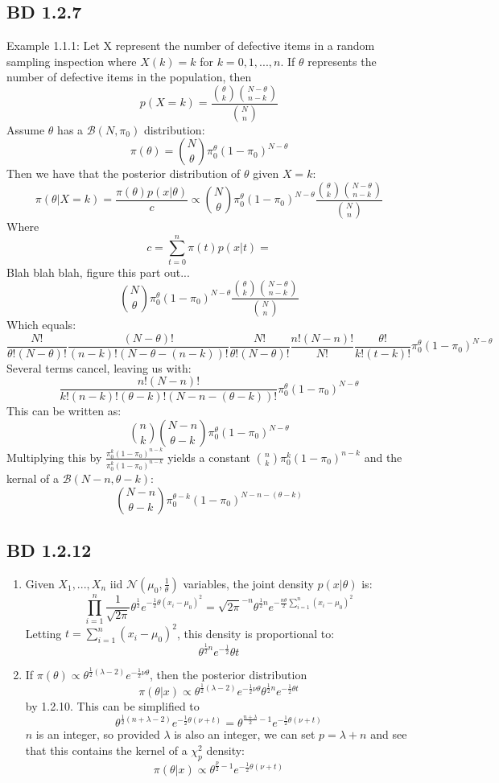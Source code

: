 \documentclass[a4paper,12pt]{article}
\begin{document}
\subsection{BD 1.2.7}
Example 1.1.1: Let X represent the number of defective items in a random sampling inspection where $X(k)=k$ for $k=0,1,...,n$. If $\theta$ represents the number of defective items in the population, then $$p(X=k)=\frac{{\theta\choose k}{N-\theta\choose n-k}}{{N\choose n}}$$ Assume $\theta$ has a $\mathcal{B}(N,\pi_0)$ distribution: $$\pi(\theta)={N\choose\theta}\pi_0^\theta(1-\pi_0)^{N-\theta}$$
Then we have that the posterior distribution of $\theta$ given $X=k$: $$\pi(\theta|X=k)=\frac{\pi(\theta)p(x|\theta)}{c}\propto{N\choose\theta}\pi_0^\theta(1-\pi_0)^{N-\theta}\frac{{\theta\choose k}{N-\theta\choose n-k}}{{N\choose n}}$$
Where $$c=\sum_{t=0}^n\pi(t)p(x|t)=$$
Blah blah blah, figure this part out...
$${N\choose\theta}\pi_0^\theta(1-\pi_0)^{N-\theta}\frac{{\theta\choose k}{N-\theta\choose n-k}}{{N\choose n}}$$
Which equals:$$\frac{N!}{\theta!(N-\theta)!}\frac{(N-\theta)!}{(n-k)!(N-\theta-(n-k))!}\frac{N!}{\theta!(N-\theta)!}\frac{n!(N-n)!}{N!}\frac{\theta!}{k!(t-k)!}\pi_0^{\theta}(1-\pi_0)^{N-\theta}$$
Several terms cancel, leaving us with:
$$\frac{n!(N-n)!}{k!(n-k)!(\theta-k)!(N-n-(\theta-k))!}\pi_0^\theta(1-\pi_0)^{N-\theta}$$
This can be written as:
$${n\choose k}{N-n\choose \theta-k}\pi_0^\theta(1-\pi_0)^{N-\theta}$$
Multiplying this by $\frac{\pi_0^k(1-\pi_0)^{n-k}}{\pi_0^k(1-\pi_0)^{n-k}}$ yields a constant ${n\choose k}\pi_0^k(1-\pi_0)^{n-k}$ and the kernal of a $\mathcal{B}(N-n,\theta-k)$:$${N-n\choose \theta-k}\pi_0^{\theta-k}(1-\pi_0)^{N-n-(\theta-k)}$$
\subsection{BD 1.2.12}
\begin{enumerate}
  \item Given $X_1,...,X_n$ iid $\mathcal{N}(\mu_0,\frac{1}{\theta})$ variables, the joint density $p(x|\theta)$ is:
  $$\prod_{i=1}^n \frac{1}{\sqrt{2\pi}}\theta^{\frac{1}{2}}e^{-\frac{1}{2}\theta(x_i-\mu_0)^2}=\sqrt{2\pi}^{-n} \theta^{\frac{1}{2}n}e^{-\frac{n\theta}{2}\sum_{i=1}^n(x_i-\mu_0)^2}$$
  Letting $t=\sum_{i=1}^n (x_i-\mu_0)^2$, this density is proportional to:$$\theta^{\frac{1}{2}n}e^{-\frac{1}{2}}\theta t$$
  \item If $\pi(\theta)\propto\theta^{\frac{1}{2}(\lambda-2)}e^{-\frac{1}{2}\nu\theta}$, then the posterior distribution $$\pi(\theta|x)\propto\theta^{\frac{1}{2}(\lambda-2)}e^{-\frac{1}{2}\nu\theta} \theta^{\frac{1}{2}n}e^{-\frac{1}{2}\theta t}$$ by 1.2.10. This can be simplified to $$\theta^{\frac{1}{2}(n+\lambda-2)}e^{-\frac{1}{2}\theta(\nu+t)}=\theta^{\frac{n+\lambda}{2}-1}e^{-\frac{1}{2}\theta(\nu+t)}$$
  $n$ is an integer, so provided $\lambda$ is also an integer, we can set $p=\lambda+n$ and see that this contains the kernel of a $\chi_{p}^2$ density: $$\pi(\theta|x)\propto\theta^{\frac{p}{2}-1}e^{-\frac{1}{2}\theta(\nu+t)}$$
\end{enumerate}
\end{document}

